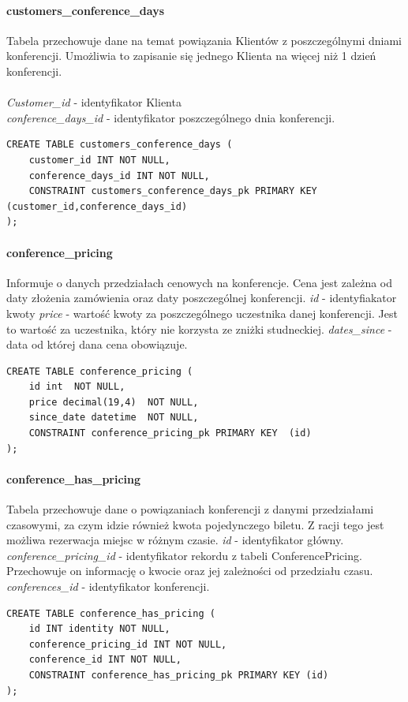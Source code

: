 \documentclass[12pt]{article}
\begin{document}
\paragraph{customers\_conference\_days\\}
Tabela przechowuje dane na temat powiązania Klientów z poszczególnymi dniami konferencji. Umożliwia to zapisanie się jednego Klienta na więcej niż 1 dzień konferencji.\\ \\
\textit{Customer\_id} - identyfikator Klienta \\
\textit{conference\_days\_id} - identyfikator poszczególnego dnia konferencji.
\begin{lstlisting}
CREATE TABLE customers_conference_days (
	customer_id INT NOT NULL,
	conference_days_id INT NOT NULL,
	CONSTRAINT customers_conference_days_pk PRIMARY KEY (customer_id,conference_days_id)
);
\end{lstlisting}

\paragraph{conference\_pricing \newline}
Informuje o danych przedziałach cenowych na konferencje. Cena jest zależna od daty złożenia zamówienia oraz daty poszczególnej konferencji.\newline \newline
\textit{id} - identyfiakator kwoty \newline
\textit{price} - wartość kwoty za poszczególnego uczestnika danej konferencji. Jest to wartość za uczestnika, który nie korzysta ze zniżki studneckiej.\newline
\textit{dates\_since} - data od której dana cena obowiązuje.
\begin{lstlisting}
CREATE TABLE conference_pricing (
    id int  NOT NULL,
    price decimal(19,4)  NOT NULL,
    since_date datetime  NOT NULL,
    CONSTRAINT conference_pricing_pk PRIMARY KEY  (id)
);
\end{lstlisting}

\paragraph{conference\_has\_pricing \newline}
Tabela przechowuje dane o powiązaniach konferencji z danymi przedziałami czasowymi, za czym idzie również kwota pojedynczego biletu.
Z racji tego jest możliwa rezerwacja miejsc w różnym czasie. \newline
\textit{id} - identyfikator główny.
\textit{conference\_pricing\_id} - identyfikator rekordu z tabeli ConferencePricing. Przechowuje on informację o kwocie oraz jej zależności od przedziału czasu. \newline
\textit{conferences\_id} - identyfikator konferencji. \\
\begin{lstlisting}
CREATE TABLE conference_has_pricing (
	id INT identity NOT NULL,
	conference_pricing_id INT NOT NULL,
	conference_id INT NOT NULL,
	CONSTRAINT conference_has_pricing_pk PRIMARY KEY (id)
);
\end{lstlisting}
\end{document}
